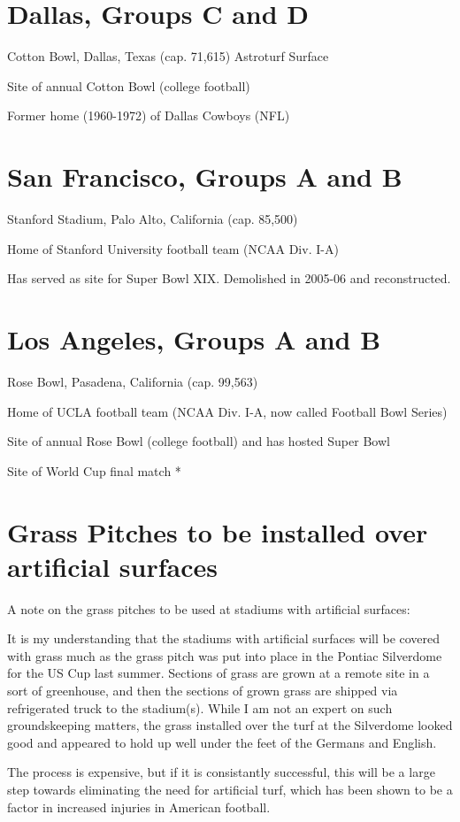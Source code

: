 \section{Dallas, Groups C and D}
Cotton Bowl, Dallas, Texas (cap. 71,615) Astroturf Surface

Site of annual Cotton Bowl (college football)

Former home (1960-1972) of Dallas Cowboys (NFL)
\section{San Francisco, Groups A and B} 
Stanford Stadium, Palo Alto, California (cap. 85,500)

Home of Stanford University football team (NCAA Div. I-A)
 
Has served as site for Super Bowl XIX.  Demolished in 2005-06 and reconstructed.
\section{Los Angeles, Groups A and B} 
Rose Bowl, Pasadena, California (cap. 99,563)

Home of UCLA football team (NCAA Div. I-A, now called Football Bowl Series)

Site of annual Rose Bowl (college football) and has hosted Super Bowl

Site of World Cup final match *
\section{Grass Pitches to be installed over artificial surfaces}
A note on the grass pitches to be used at stadiums with artificial surfaces:

It is my understanding that the stadiums with artificial surfaces will be 
covered with grass much as the grass pitch was put into place in the Pontiac 
Silverdome for the US Cup last summer.  Sections of grass are grown at a remote
site in a sort of greenhouse, and then the sections of grown grass are shipped
via refrigerated truck to the stadium(s).  While I am not an expert on such 
groundskeeping matters, the grass installed over the turf at the Silverdome 
looked good and appeared to hold up well under the feet of the Germans and 
English.  

The process is expensive, but if it is consistantly successful, this will be a
large step towards eliminating the need for artificial turf, which has been 
shown to be a factor in increased injuries in American football.

